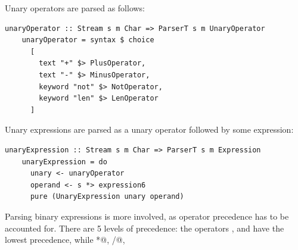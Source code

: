 \documentclass[UdineBachThesis,american,11pt]{PhdThesis}
\begin{document}
  Unary operators are parsed as follows:

  \begin{lstlisting}[gobble=4,basicstyle=\ttfamily\small]
    unaryOperator :: Stream s m Char => ParserT s m UnaryOperator
    unaryOperator = syntax $ choice
      [
        text "+" $> PlusOperator,
        text "-" $> MinusOperator,
        keyword "not" $> NotOperator,
        keyword "len" $> LenOperator
      ]
  \end{lstlisting}

  Unary expressions are parsed as a unary operator followed by some expression:

  \begin{lstlisting}[gobble=4,basicstyle=\ttfamily\small]
    unaryExpression :: Stream s m Char => ParserT s m Expression
    unaryExpression = do
      unary <- unaryOperator
      operand <- s *> expression6
      pure (UnaryExpression unary operand)
  \end{lstlisting}

  Parsing binary expressions is more involved, as operator precedence has to be
  accounted for. There are 5 levels of precedence: the operators
  \lstinline@and@, \lstinline@or@ and \lstinline@xor@ have the lowest
  precedence, while \lstinline@*@, \lstinline@/@,
  \lstinline@%@ have the highest.
\end{document}
